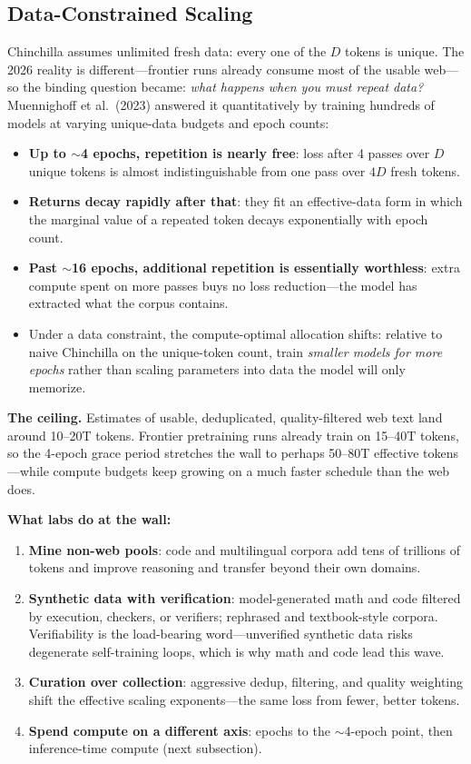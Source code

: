 \subsection{Data-Constrained Scaling}
\label{sec:data_constrained}

Chinchilla assumes unlimited fresh data: every one of the $D$ tokens is unique. The 2026 reality is different---frontier runs already consume most of the usable web---so the binding question became: \textit{what happens when you must repeat data?} Muennighoff et al.\ (2023) answered it quantitatively by training hundreds of models at varying unique-data budgets and epoch counts:

\begin{itemize}
    \item \textbf{Up to $\sim$4 epochs, repetition is nearly free}: loss after 4 passes over $D$ unique tokens is almost indistinguishable from one pass over $4D$ fresh tokens.
    \item \textbf{Returns decay rapidly after that}: they fit an effective-data form in which the marginal value of a repeated token decays exponentially with epoch count.
    \item \textbf{Past $\sim$16 epochs, additional repetition is essentially worthless}: extra compute spent on more passes buys no loss reduction---the model has extracted what the corpus contains.
    \item Under a data constraint, the compute-optimal allocation shifts: relative to naive Chinchilla on the unique-token count, train \textit{smaller models for more epochs} rather than scaling parameters into data the model will only memorize.
\end{itemize}

\textbf{The ceiling.} Estimates of usable, deduplicated, quality-filtered web text land around 10--20T tokens. Frontier pretraining runs already train on 15--40T tokens, so the 4-epoch grace period stretches the wall to perhaps 50--80T effective tokens---while compute budgets keep growing on a much faster schedule than the web does.

\textbf{What labs do at the wall:}
\begin{enumerate}
    \item \textbf{Mine non-web pools}: code and multilingual corpora add tens of trillions of tokens and improve reasoning and transfer beyond their own domains.
    \item \textbf{Synthetic data with verification}: model-generated math and code filtered by execution, checkers, or verifiers; rephrased and textbook-style corpora. Verifiability is the load-bearing word---unverified synthetic data risks degenerate self-training loops, which is why math and code lead this wave.
    \item \textbf{Curation over collection}: aggressive dedup, filtering, and quality weighting shift the effective scaling exponents---the same loss from fewer, better tokens.
    \item \textbf{Spend compute on a different axis}: epochs to the $\sim$4-epoch point, then inference-time compute (next subsection).
\end{enumerate}

